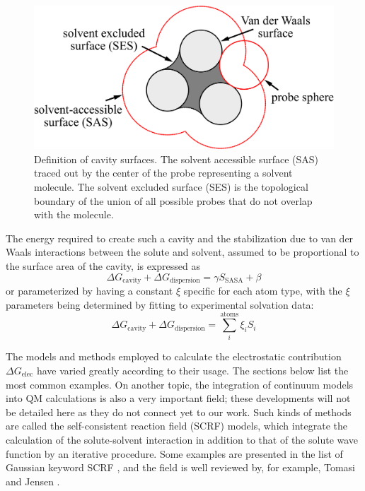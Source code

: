 \begin{figure}[h]
\begin{centering}
\includegraphics[width=0.55\columnwidth]{_figure/SASA}
\par\end{centering}
\caption[Definition of cavity surfaces]{Definition of cavity surfaces\label{fig:sasa}. The solvent accessible
surface (SAS) traced out by the center of the probe representing a
solvent molecule. The solvent excluded surface (SES) is the topological
boundary of the union of all possible probes that do not overlap with
the molecule.}
\end{figure}

The energy required to create such a cavity and the stabilization
due to van der Waals interactions between the solute and solvent,
assumed to be proportional to the surface area of the cavity, is expressed
as
\begin{equation}
\Delta G_{\mathrm{cavity}}+\Delta G_{\mathrm{dispersion}}=\gamma S_{\mathrm{SASA}}+\beta
\end{equation}
or parameterized by having a constant $\xi$ specific for each atom
type, with the $\xi$ parameters being determined by fitting to experimental
solvation data:
\begin{equation}
\Delta G_{\mathrm{cavity}}+\Delta G_{\mathrm{dispersion}}=\sum_{i}^{\mathrm{atoms}}\xi_{i}S_{i}
\end{equation}

The models and methods employed to calculate the electrostatic contribution
$\Delta G_{\mathrm{elec}}$ have varied greatly according to their
usage. The sections below list the most common examples. On another topic,
the integration of continuum models into \acs{QM} calculations is
also a very important field; these developments will not be detailed
here as they do not connect yet to our work. Such kinds of methods
are called the self-consistent reaction field (SCRF) models, which
integrate the calculation of the solute-solvent interaction in addition
to that of the solute wave function by an iterative procedure. Some
examples are presented in the list of Gaussian keyword SCRF \citep{scrf},
and the field is well reviewed by, for example, Tomasi \citep{Tomasi_1994_implicit_model,tomasi_quantum_2005}
and Jensen \citep{Jensen}.

